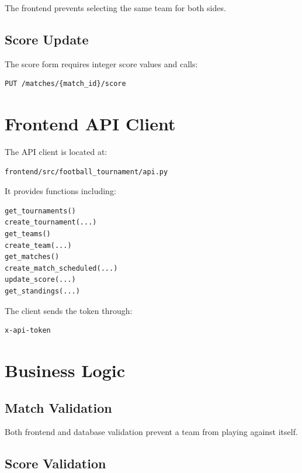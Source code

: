 \documentclass[11pt,a4paper]{article}
\begin{document}
The frontend prevents selecting the same team for both sides.

\subsection{Score Update}

The score form requires integer score values and calls:

\begin{lstlisting}
PUT /matches/{match_id}/score
\end{lstlisting}

\section{Frontend API Client}

The API client is located at:

\begin{lstlisting}
frontend/src/football_tournament/api.py
\end{lstlisting}

It provides functions including:

\begin{lstlisting}
get_tournaments()
create_tournament(...)
get_teams()
create_team(...)
get_matches()
create_match_scheduled(...)
update_score(...)
get_standings(...)
\end{lstlisting}

The client sends the token through:

\begin{lstlisting}
x-api-token
\end{lstlisting}

\section{Business Logic}

\subsection{Match Validation}

Both frontend and database validation prevent a team from playing
against itself.

\subsection{Score Validation}
\end{document}
